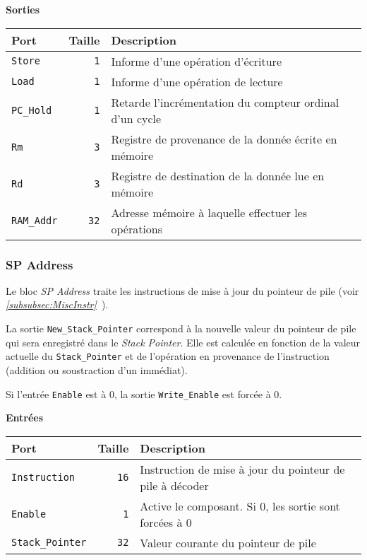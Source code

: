 \vspace{1em}
\textbf{Sorties}\\

\begin{tabular}{|l|r|l|}
\hline 
\textbf{Port} & \textbf{Taille} & \textbf{Description}\\
\hline

\texttt{Store}		&  \texttt{1} & Informe d'une opération d'écriture\\
\hline
\texttt{Load}		&  \texttt{1} & Informe d'une opération de lecture\\
\hline
\texttt{PC\_Hold}	&  \texttt{1} & Retarde l'incrémentation du compteur ordinal d'un cycle\\
\hline
\texttt{Rm}		&  \texttt{3} & Registre de provenance de la donnée écrite en mémoire\\
\hline
\texttt{Rd}		&  \texttt{3} & Registre de destination de la donnée lue en mémoire\\
\hline
\texttt{RAM\_Addr}	& \texttt{32} & Adresse mémoire à laquelle effectuer les opérations\\

\hline
\end{tabular}




\subsubsection{SP Address}


Le bloc \textit{SP Address} traite les instructions de mise à jour du pointeur de pile (voir \textit{\ref{subsubsec:MiscInstr}~}).

La sortie \texttt{New\_Stack\_Pointer} correspond à la nouvelle valeur du pointeur de pile qui sera enregistré dans le \textit{Stack Pointer}.
Elle est calculée en fonction de la valeur actuelle du \texttt{Stack\_Pointer} et de l'opération en provenance de l'instruction (addition ou soustraction d'un immédiat).

Si l'entrée \texttt{Enable} est à 0, la sortie \texttt{Write\_Enable} est forcée à 0.


\textbf{Entrées}\\

\begin{tabular}{|l|r|l|}
\hline
\textbf{Port}		& \textbf{Taille} & \textbf{Description}\\
\hline

\texttt{Instruction}	& \texttt{16} & Instruction de mise à jour du pointeur de pile à décoder\\
\hline
\texttt{Enable}		&  \texttt{1} & Active le composant. Si 0, les sortie sont forcées à 0\\
\hline
\texttt{Stack\_Pointer}	& \texttt{32} & Valeur courante du pointeur de pile\\

\hline
\end{tabular}

